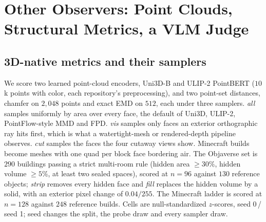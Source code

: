 \section{Other Observers: Point Clouds, Structural Metrics, a VLM Judge}
\label{app:probe3d}

\subsection{3D-native metrics and their samplers}

We score two learned point-cloud encoders, Uni3D-B and ULIP-2 PointBERT ($10$k points with
color, each repository's preprocessing), and two point-set distances, chamfer on $2{,}048$
points and exact EMD on $512$, each under three samplers. \emph{all} samples uniformly by
area over every face, the default of Uni3D, ULIP-2, PointFlow-style MMD and FPD.
\emph{vis} samples only faces an exterior orthographic ray hits first, which is what a
watertight-mesh or rendered-depth pipeline observes. \emph{cut} samples the faces the four
cutaway views show. Minecraft builds become meshes with one quad per block face bordering
air. The Objaverse set is $290$ buildings passing a strict multi-room rule (hidden area
$\geq 30\%$, hidden volume $\geq 5\%$, at least two sealed spaces), scored at $n{=}96$
against $130$ reference objects; \emph{strip} removes every hidden face and \emph{fill}
replaces the hidden volume by a solid, with an exterior pixel change of $0.04/255$. The
Minecraft ladder is scored at $n{=}128$ against $248$ reference builds. Cells are
null-standardized $z$-scores, seed 0\,/\,seed 1; seed changes the split, the probe draw and
every sampler draw.

